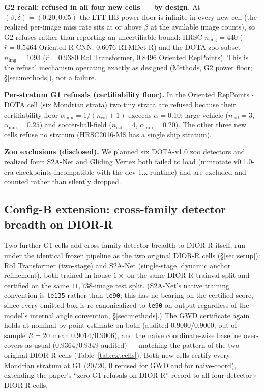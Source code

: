 \documentclass[11pt]{article}
\begin{document}
\textbf{G2 recall: refused in all four new cells --- by design.} At $(\beta,\delta)=(0.20,0.05)$ the LTT-HB
power floor is infinite in every new cell (the realized per-image miss rate sits at or above $\beta$ at the
available image counts), so G2 refuses rather than reporting an uncertifiable bound: HRSC
$n_{\mathrm{img}}=440$ ($\hat r=0.5464$ Oriented R-CNN, $0.6076$ RTMDet-R) and the DOTA zoo subset
$n_{\mathrm{img}}=1093$ ($\hat r=0.9380$ RoI Transformer, $0.8496$ Oriented RepPoints). This is the refusal
mechanism operating exactly as designed (Methods, G2 power floor; \S\ref{sec:methods}), not a failure.

\textbf{Per-stratum G1 refusals (certifiability floor).} In the Oriented RepPoints $\cdot$ DOTA cell (six
Mondrian strata) two tiny strata are refused because their certifiability floor
$\alpha_{\min}=1/(n_{\mathrm{cal}}+1)$ exceeds $\alpha=0.10$: large-vehicle ($n_{\mathrm{cal}}=3$,
$\alpha_{\min}=0.25$) and soccer-ball-field ($n_{\mathrm{cal}}=4$, $\alpha_{\min}=0.20$). The other three
new cells refuse no stratum (HRSC2016-MS has a single ship stratum).

\textbf{Zoo exclusions (disclosed).} We planned six DOTA-v1.0 zoo detectors and realized four: S2A-Net
\citep{han2022s2anet} and Gliding Vertex \citep{xu2021glidingvertex} both failed to load (mmrotate v0.1.0-era
checkpoints incompatible with the dev-1.x runtime) and are excluded-and-counted rather than silently dropped.

\subsection{Config-B extension: cross-family detector breadth on DIOR-R}\label{sec:configB}
Two further G1 cells add cross-family detector breadth to DIOR-R itself, run under the identical frozen
pipeline as the two original DIOR-R cells (\S\ref{sec:setup}): RoI Transformer (two-stage) and S2A-Net
(single-stage, dynamic anchor refinement), both trained in house $1\times$ on the same DIOR-R trainval split
and certified on the same $11{,}738$-image test split. (S2A-Net's native training convention is
\texttt{le135} rather than \texttt{le90}; this has no bearing on the certified score, since every emitted box
is re-canonicalized to \texttt{le90} on output regardless of the model's internal angle convention,
\S\ref{sec:methods}.) The GWD certificate again holds at nominal by point estimate on both (audited
$0.9000$/$0.9000$; out-of-sample $R{=}20$ mean $0.9014$/$0.9006$), and the naive coordinate-wise baseline
over-covers as usual ($0.9364$/$0.9349$ audited) --- matching the pattern of the two original DIOR-R cells
(Table~\ref{tab:extcells}). Both new cells certify every Mondrian stratum at G1 ($20/20$, $0$ refused
for GWD and for naive-coord), extending the paper's ``zero G1 refusals on DIOR-R'' record to all four
detector$\times$DIOR-R cells.
\end{document}
